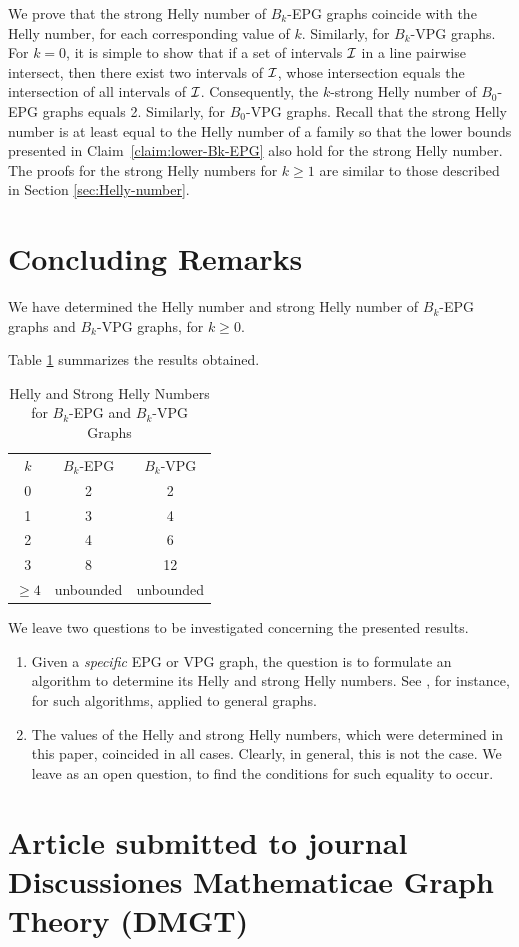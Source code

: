 We prove that the strong Helly number of $B_k$-EPG graphs coincide with the Helly number, for each corresponding value of $k$. Similarly, for $B_k$-VPG graphs. For $k=0$, it is simple to show that if a set of intervals $\cal I$ in a line pairwise intersect, then there exist two intervals of $\cal I$, whose intersection equals the intersection of all intervals of $\cal I$. Consequently, the $k$-strong Helly number of $B_0$-EPG graphs equals 2. 
Similarly, for $B_0$-VPG graphs. 
Recall that the strong Helly number is at least equal to the Helly number of a family so that the lower bounds presented in Claim~\ref{claim:lower-Bk-EPG} also hold for the strong Helly number. The proofs for the strong Helly numbers for $k \geq 1$ are similar to those described in Section \ref{sec:Helly-number}.  



\section{Concluding Remarks}\label{sec:concludingRemarks}
We have determined the Helly number and strong Helly number of $B_k$-EPG graphs and $B_k$-VPG graphs, for $k \geq 0$. 

Table \ref{tab:Helly-Strong-Helly} summarizes the results obtained.
 
\Large 

\begin{table}[htb]
    \centering
    \caption{Helly and Strong Helly Numbers for $B_k$-EPG and $B_k$-VPG Graphs}
    \label{tab:Helly-Strong-Helly}
    \begin{tabular}{c|c|c}
    \cline{1-3} $k$  & $B_k$-EPG & $B_k$-VPG \\
    \cline{1-3} 0 & 2 & 2 \\
    \cline{1-3} 1 & 3 & 4 \\
    \cline{1-3} 2 & 4 & 6 \\
    \cline{1-3} 3 & 8 & 12 \\
    \cline{1-3} $\geq 4$ & unbounded & unbounded \\
    \cline{1-3} 
    \end{tabular}
\end{table}

\normalsize

We leave two questions to be investigated concerning the presented results.

\begin{enumerate}
\item Given a {\it specific}  EPG or VPG graph, the question is to formulate an algorithm to determine its Helly and strong Helly numbers. See \cite{dourado2008improved}, for instance, for such algorithms, applied to general graphs. 

\item The values of the Helly and strong Helly numbers, which were determined in this paper, coincided in all cases. Clearly, in general, this is not the case. We leave as an open question, to find the conditions for such equality to occur. \end{enumerate}


\newpage


\section{Article submitted to journal  Discussiones Mathematicae Graph Theory (DMGT)} 
